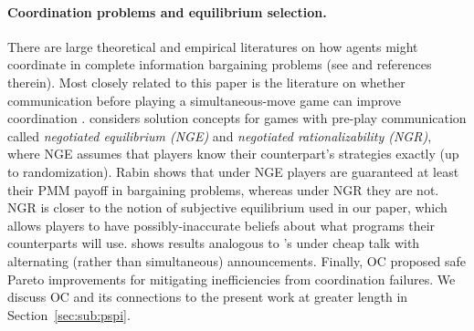 \documentclass[sigconf]{aamas}
\theoremstyle{definition}
\begin{document}
\paragraph{Coordination problems and equilibrium selection.}
There are large theoretical and empirical
literatures on how agents might coordinate
in complete information bargaining problems
(see
\citet{schuessler2019focal} and 
references therein). 
Most closely related to this 
paper is the literature 
on whether communication before playing 
a simultaneous-move game
can improve coordination
\citep{farrell1987cheap,Rabin1991AMO,farrell1996cheap,crawford2017let,he2019power}. 
\citet{Rabin1991AMO} considers solution concepts for games with 
pre-play communication called \textit{negotiated equilibrium (NGE)} and
\textit{negotiated rationalizability (NGR)}, where NGE assumes that
players know their counterpart's strategies exactly (up to randomization).
Rabin shows that under NGE players
are guaranteed at least their PMM payoff 
in bargaining problems, whereas under NGR they are not. NGR is closer to the 
notion of subjective equilibrium used
in
our
paper, which allows 
players to
have possibly-inaccurate beliefs about what programs their counterparts
will use.
\citet{Santos2000Jul} shows results analogous to \citet{Rabin1991AMO}'s
under cheap talk with alternating (rather than simultaneous) announcements.
Finally, OC proposed safe Pareto improvements
for mitigating inefficiencies from coordination failures.
We
discuss
OC
and its connections to the present work
at greater length
in Section~\ref{sec:sub:pspi}.
\end{document}
